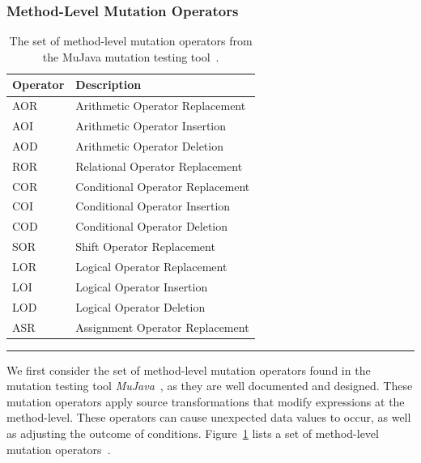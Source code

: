 \subsubsection{Method-Level Mutation Operators}
\label{subsubsec:background_method_operators}
\begin{table}[ht!]
  \centering
  \begin{tabular}{|l|l|}
    \hline
    \rowcolor[RGB]{169,196,223}
    \textbf{Operator} & \textbf{Description} \\
    \hline AOR & Arithmetic Operator Replacement \\
    \hline AOI & Arithmetic Operator Insertion \\
    \hline AOD & Arithmetic Operator Deletion \\
    \hline ROR & Relational Operator Replacement \\
    \hline COR & Conditional Operator Replacement \\
    \hline COI & Conditional Operator Insertion \\
    \hline COD & Conditional Operator Deletion \\
    \hline SOR & Shift Operator Replacement \\
    \hline LOR & Logical Operator Replacement \\
    \hline LOI & Logical Operator Insertion \\
    \hline LOD & Logical Operator Deletion \\
    \hline ASR & Assignment Operator Replacement \\
    \hline
  \end{tabular}
  \caption{The set of method-level mutation operators from the MuJava mutation testing tool~\cite{MOK05, MO05a}.}
  \label{tab:method_operators}
  \vspace{2mm}
  \hrule
\end{table}

We first consider the set of method-level mutation operators found in the mutation testing tool \emph{MuJava}~\cite{MOK05}, as they are well documented and designed. These mutation operators apply source transformations that modify expressions at the method-level. These operators can cause unexpected data values to occur, as well as adjusting the outcome of conditions. Figure~\ref{tab:method_operators} lists a set of method-level mutation operators~\cite{MO05a}.

